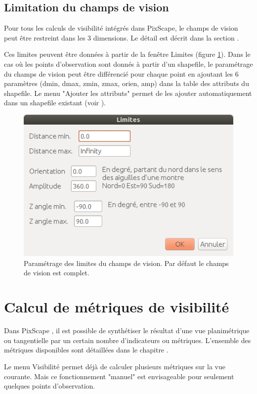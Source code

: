 \documentclass{report}
\begin{document}
\subsection{Limitation du champs de vision}
\label{bounds_ui}
Pour tous les calculs de visibilité intégrés dans PixScape, le champs de vision peut être restreint dans les 3 dimensions. Le détail est décrit dans la section .

Ces limites peuvent être données à partir de la fenêtre Limites (figure \ref{bounds_dlg}). Dans le cas où les points d'observation sont donnés à partir d'un shapefile, le paramétrage du champs de vision peut être différencié pour chaque point en ajoutant les 6 paramètres (dmin, dmax, zmin, zmax, orien, amp) dans la table des attributs du shapefile. Le menu "Ajouter les attributs" permet de les ajouter automatiquement dans un shapefile existant (voir ).

\begin{figure}[H]
	\includegraphics[scale=0.5]{img/bounds-fr.png} 
	\caption{Paramétrage des limites du champs de vision. Par défaut le champs de vision est complet.}
	\label{bounds_dlg}
\end{figure}

\section{Calcul de métriques de visibilité}
\label{calc_metrics}
Dans PixScape , il est possible de synthétiser le résultat d'une vue planimétrique ou tangentielle par un certain nombre d'indicateurs ou métriques. L'ensemble des métriques disponibles sont détaillées dans le chapitre . 

Le menu Visibilité permet déjà de calculer plusieurs métriques sur la vue courante. Mais ce fonctionnement "manuel" est envisageable pour seulement quelques points d'observation. 
\end{document}
